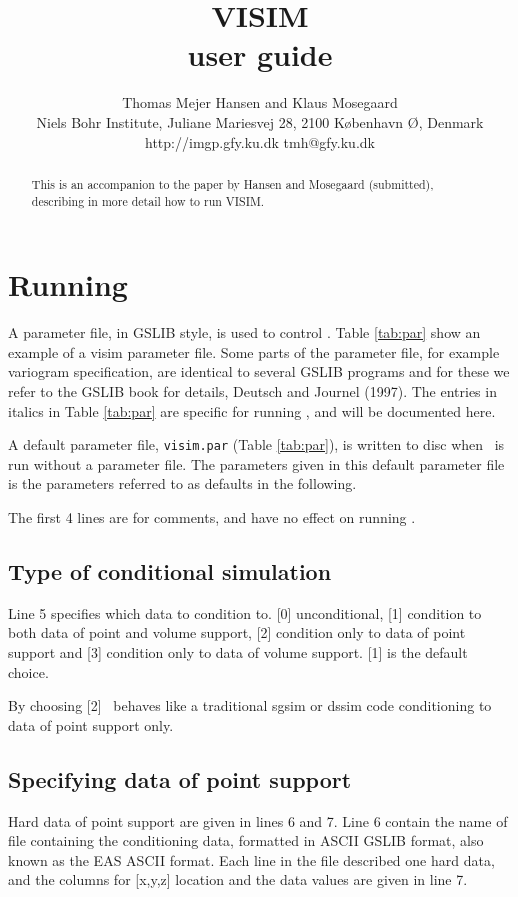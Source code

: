 \documentclass[12t]{article}
\title{VISIM\\user guide}
\author{Thomas Mejer Hansen and Klaus Mosegaard\\
Niels Bohr Institute, Juliane Mariesvej 28, 2100 K\o benhavn \O, Denmark\\
http://imgp.gfy.ku.dk tmh@gfy.ku.dk}
\begin{document}
\maketitle

\begin{abstract}
This is an accompanion to the paper by Hansen and Mosegaard (submitted), describing in more detail how to run VISIM.
\end{abstract}




\section{Running \visimprog}
\label{sec:running}
A parameter file, in GSLIB style, is used to control \visimprog. Table
\ref{tab:par} show an example of a visim parameter file. Some parts of
the parameter file, for example variogram specification, are identical
to several GSLIB programs and for these we refer to the GSLIB book for
details, Deutsch and Journel (1997). 
The entries in italics in Table \ref{tab:par} are specific for running \visimprog, and will be documented here.

A default parameter file, \texttt{visim.par} (Table \ref{tab:par}), is written to disc when
\visimprog~is run without a parameter file. The parameters given in this default parameter file is the parameters referred to as defaults in the following.

The first 4 lines are for comments, and have no effect on running \visimprog.

\subsection{Type of conditional simulation}
Line 5 specifies which data to condition to. [0] unconditional, [1]
condition to both data of point and volume support, [2] condition only
to data of point support and [3] condition only to data of volume support. 
[1] is the default choice.

By choosing [2] \visimprog~behaves like a traditional sgsim or dssim
code conditioning to data of point support only.

\subsection{Specifying data of point support}
Hard data of point support are given in lines 6 and 7. Line 6 contain
the name of file containing the conditioning data, formatted in ASCII
GSLIB format, also known as the EAS ASCII format. Each line in the
file described one hard data, and the columns for [x,y,z] location and the data
values are given in line 7.
\end{document}
